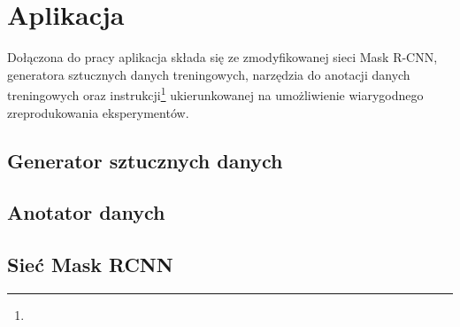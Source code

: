 \chapter{Aplikacja}

Dołączona do pracy aplikacja składa się ze zmodyfikowanej sieci Mask R-CNN, generatora sztucznych danych treningowych, narzędzia do anotacji danych treningowych oraz instrukcji\footnote{} ukierunkowanej na umożliwienie wiarygodnego zreprodukowania eksperymentów.
\\


\section{Generator sztucznych danych}


\section{Anotator danych}


\section{Sieć Mask RCNN}

